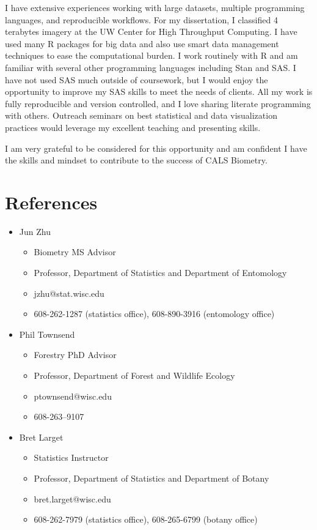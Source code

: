 \documentclass[11pt, sans]{moderncv}
\begin{document}
I have extensive experiences working with large datasets, multiple
programming languages, and reproducible workflows. For my
dissertation, I classified 4 terabytes imagery at the UW Center for
High Throughput Computing.  I have used many R packages for big data
and also use smart data management techniques to ease the
computational burden.  I work routinely with R and am familiar with
several other programming languages including Stan and SAS.  I have
not used SAS much outside of coursework, but I would enjoy the
opportunity to improve my SAS skills to meet the needs of clients.
All my work is fully reproducible and version controlled, and I love
sharing literate programming with others.  Outreach seminars on best
statistical and data visualization practices would leverage my
excellent teaching and presenting skills.

I am very grateful to be considered for this opportunity and am
confident I have the skills and mindset to contribute to the
success of CALS Biometry.

\makeletterclosing
\pagebreak
\section*{References}
\label{sec:orge2821a0}
\begin{itemize}
\item Jun Zhu
\begin{itemize}
\item Biometry MS Advisor
\item Professor, Department of Statistics and Department of Entomology
\item jzhu@stat.wisc.edu
\item 608-262-1287 (statistics office), 608-890-3916 (entomology office)
\end{itemize}
\item Phil Townsend
\begin{itemize}
\item Forestry PhD Advisor
\item Professor, Department of Forest and Wildlife Ecology
\item ptownsend@wisc.edu
\item 608-263–9107
\end{itemize}
\item Bret Larget
\begin{itemize}
\item Statistics Instructor
\item Professor, Department of Statistics and Department of Botany
\item bret.larget@wisc.edu
\item 608-262-7979 (statistics office), 608-265-6799 (botany office)
\end{itemize}
\end{itemize}
\end{document}
